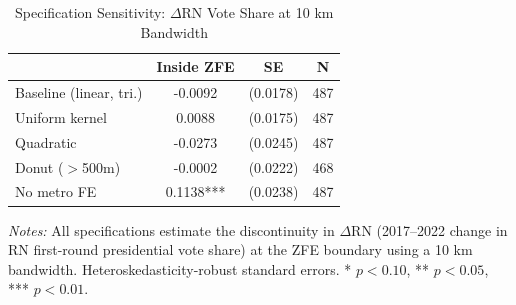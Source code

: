 \begin{table}[H]
\centering
\caption{Specification Sensitivity: $\Delta$RN Vote Share at 10 km Bandwidth}
\label{tab:specs}
\begin{threeparttable}
\begin{tabular}{lccc}
\toprule
 & Inside ZFE & SE & N \\
\midrule
  Baseline (linear, tri.) & -0.0092 & (0.0178) & 487 \\
  Uniform kernel & 0.0088 & (0.0175) & 487 \\
  Quadratic & -0.0273 & (0.0245) & 487 \\
  Donut ($>$500m) & -0.0002 & (0.0222) & 468 \\
  No metro FE & 0.1138*** & (0.0238) & 487 \\
\bottomrule
\end{tabular}
\begin{tablenotes}[flushleft]
\small
\item \textit{Notes:} All specifications estimate the discontinuity in $\Delta$RN (2017--2022 change in RN first-round presidential vote share) at the ZFE boundary using a 10 km bandwidth. Heteroskedasticity-robust standard errors. * $p<0.10$, ** $p<0.05$, *** $p<0.01$.
\end{tablenotes}
\end{threeparttable}
\end{table}
